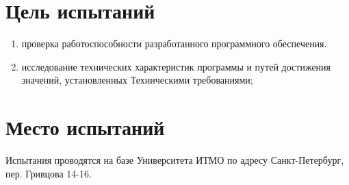 \section{Цель испытаний}

\begin{enumerate}
    \item проверка работоспособности разработанного программного обеспечения.
    \item исследование технических характеристик программы и путей достижения значений, установленных Техническими требованиями;	
\end{enumerate}


\section{Место испытаний}

Испытания проводятся на базе Университета ИТМО по адресу Санкт-Петербург, пер. Гривцова 14-16.